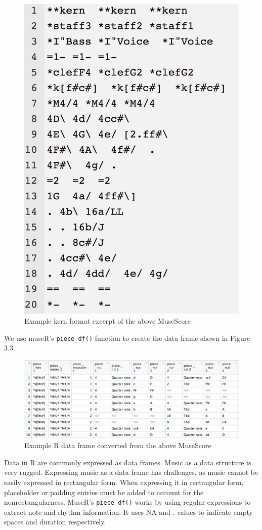 \documentclass[12pt,twoside]{reedthesis}
\theoremstyle{definition}
\theoremstyle{definition}
\theoremstyle{definition}
\theoremstyle{remark}
\begin{document}
\begin{figure}[h]
\centering
\includegraphics[scale = .5]{images/ex1k.png}
\caption{Example kern format excerpt of the above MuseScore}
\label{subd}
\end{figure}
We use museR's \texttt{piece\_df()} function to create the data frame
shown in Figure 3.3.
\begin{figure}[h]
\centering
\includegraphics[scale = .5]{images/ex1r.png}
\caption{Example R data frame converted from the above MuseScore}
\label{subd}
\end{figure}
Data in R are commonly expressed as data frames. Music as a data
structure is very rugged. Expressing music as a data frame has
challenges, as music cannot be easily expressed in rectangular form.
When expressing it in rectangular form, placeholder or padding entries
must be added to account for the nonrectangularness. MuseR's
\texttt{piece\_df()} works by using regular expressions to extract note
and rhythm information. It uses NA and . values to indicate empty spaces
and duration respectively.
\end{document}
